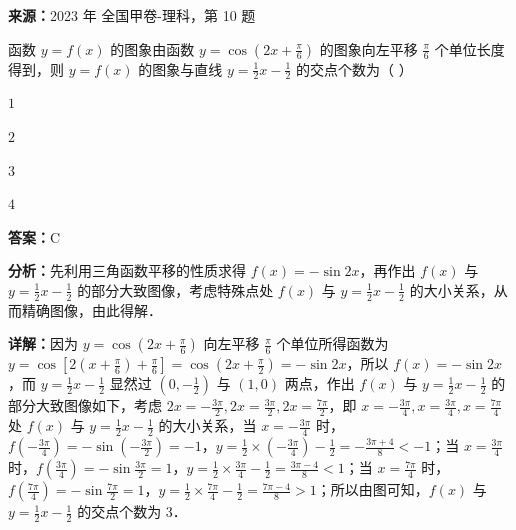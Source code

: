 \begin{question}[points=5]
\textbf{来源：}2023 年 全国甲卷-理科，第 10 题\par
函数 $y = f(x)$ 的图象由函数 $y = \cos\left(2x + \frac{\pi}{6}\right)$ 的图象向左平移 $\frac{\pi}{6}$ 个单位长度得到，则 $y = f(x)$ 的图象与直线 $y = \frac{1}{2}x - \frac{1}{2}$ 的交点个数为（                  ）
\begin{choices}
  \item $1$
  \item $2$
  \item $3$
  \item $4$
\end{choices}
\begin{solution}
\textbf{答案：}C

\textbf{分析：}先利用三角函数平移的性质求得 $f(x) = -\sin 2x$，再作出 $f(x)$ 与 $y = \frac{1}{2}x - \frac{1}{2}$ 的部分大致图像，考虑特殊点处 $f(x)$ 与 $y = \frac{1}{2}x - \frac{1}{2}$ 的大小关系，从而精确图像，由此得解．

\textbf{详解：}因为 $y = \cos\left(2x + \frac{\pi}{6}\right)$ 向左平移 $\frac{\pi}{6}$ 个单位所得函数为 $y = \cos\left[2\left(x + \frac{\pi}{6}\right) + \frac{\pi}{6}\right] = \cos\left(2x + \frac{\pi}{2}\right) = -\sin 2x$，所以 $f(x) = -\sin 2x$，而 $y = \frac{1}{2}x - \frac{1}{2}$ 显然过 $(0, -\frac{1}{2})$ 与 $(1,0)$ 两点，作出 $f(x)$ 与 $y = \frac{1}{2}x - \frac{1}{2}$ 的部分大致图像如下，考虑 $2x = -\frac{3\pi}{2}, 2x = \frac{3\pi}{2}, 2x = \frac{7\pi}{2}$，即 $x = -\frac{3\pi}{4}, x = \frac{3\pi}{4}, x = \frac{7\pi}{4}$ 处 $f(x)$ 与 $y = \frac{1}{2}x - \frac{1}{2}$ 的大小关系，当 $x = -\frac{3\pi}{4}$ 时，$f(-\frac{3\pi}{4}) = -\sin\left(-\frac{3\pi}{2}\right) = -1$，$y = \frac{1}{2}\times\left(-\frac{3\pi}{4}\right) - \frac{1}{2} = -\frac{3\pi+4}{8} < -1$；当 $x = \frac{3\pi}{4}$ 时，$f(\frac{3\pi}{4}) = -\sin\frac{3\pi}{2} = 1$，$y = \frac{1}{2}\times\frac{3\pi}{4} - \frac{1}{2} = \frac{3\pi-4}{8} < 1$；当 $x = \frac{7\pi}{4}$ 时，$f(\frac{7\pi}{4}) = -\sin\frac{7\pi}{2} = 1$，$y = \frac{1}{2}\times\frac{7\pi}{4} - \frac{1}{2} = \frac{7\pi-4}{8} > 1$；所以由图可知，$f(x)$ 与 $y = \frac{1}{2}x - \frac{1}{2}$ 的交点个数为 3．
\end{solution}
\end{question}

